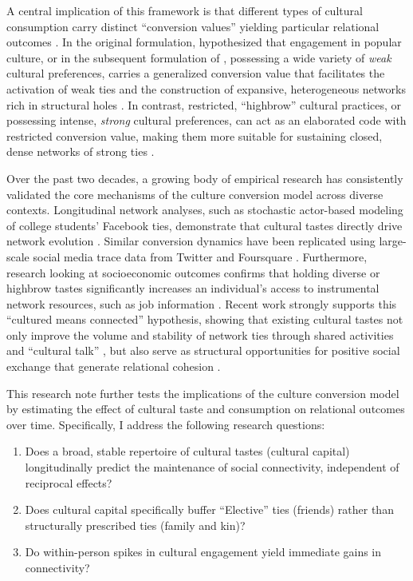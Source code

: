\documentclass[
]{article}
\begin{document}
A central implication of this framework is that different types of cultural consumption carry distinct ``conversion values'' yielding particular relational outcomes \citep{lizardo2024}. In the original formulation, \citet{lizardo2006} hypothesized that engagement in popular culture, or in the subsequent formulation of \citet{schultz2010strength-1dc}, possessing a wide variety of \textit{weak} cultural preferences, carries a generalized conversion value that facilitates the activation of weak ties and the construction of expansive, heterogeneous networks rich in structural holes \citep{lizardo2011, lizardo2013, cebula2024structure-f21}. In contrast, restricted, ``highbrow'' cultural practices, or possessing intense, \textit{strong} cultural preferences, can act as an elaborated code with restricted conversion value, making them more suitable for sustaining closed, dense networks of strong ties \citep{lizardo2011, cebula2023social-fe1}.

Over the past two decades, a growing body of empirical research has consistently validated the core mechanisms of the culture conversion model across diverse contexts. Longitudinal network analyses, such as stochastic actor-based modeling of college students' Facebook ties, demonstrate that cultural tastes directly drive network evolution \citep{lewis2018conversion-9be}. Similar conversion dynamics have been replicated using large-scale social media trace data from Twitter and Foursquare \citep{joseph2015}. Furthermore, research looking at socioeconomic outcomes confirms that holding diverse or highbrow tastes significantly increases an individual's access to instrumental network resources, such as job information \citep{lizardo2013, meuleman2021, cebula2022, jaeger2026}. Recent work strongly supports this ``cultured means connected'' hypothesis, showing that existing cultural tastes not only improve the volume and stability of network ties through shared activities and ``cultural talk'' \citep{jaeger2026, meuleman2023, lizardo2016why-418, cebula2023social-fe1}, but also serve as structural opportunities for positive social exchange that generate relational cohesion \citep{vanzella2022, hachen2022generators-923, wohl2015community-2d2}.

This research note further tests the implications of the culture conversion model by estimating the effect of cultural taste and consumption on relational outcomes over time. Specifically, I address the following research questions: 

\begin{enumerate}
    \item Does a broad, stable repertoire of cultural tastes (cultural capital) longitudinally predict the maintenance of social connectivity, independent of reciprocal effects? 
    \item Does cultural capital specifically buffer ``Elective'' ties (friends) rather than structurally prescribed ties (family and kin)? 
    \item Do within-person spikes in cultural engagement yield immediate gains in connectivity?
\end{enumerate}
\end{document}
